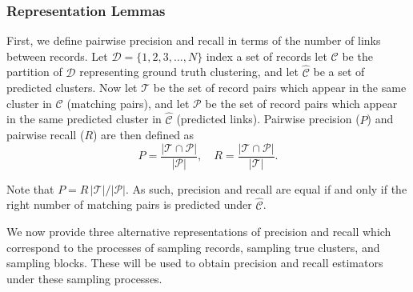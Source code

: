 \documentclass[fontsize=11pt]{article}
\theoremstyle{definition}
\begin{document}

\subsubsection{Representation Lemmas}

First, we define pairwise precision and recall in terms of the number of links between records. Let $\mathcal{D} = \{1, 2, 3, \dots, N\}$ index a set of records let $\mathcal{C}$ be the partition of $\mathcal{D}$ representing ground truth clustering, and let $\widehat{\mathcal{C}}$ be a set of predicted clusters. Now let $\mathcal{T}$ be the set of record pairs which appear in the same cluster in $\mathcal{C}$ (matching pairs), and let $\mathcal{P}$ be the set of record pairs which appear in the same predicted cluster in $\widehat{\mathcal{C}}$ (predicted links). Pairwise precision ($P$) and pairwise recall ($R$) are then defined as
\begin{equation}\label{eq:def_P_R}
    P = \frac{\lvert \mathcal{T} \cap \mathcal{P} \rvert}{\lvert \mathcal{P} \rvert}, \quad R = \frac{\lvert \mathcal{T} \cap \mathcal{P} \rvert}{\lvert \mathcal{T} \rvert}.
\end{equation}

Note that $P = R \, \lvert \mathcal{T} \rvert / \lvert \mathcal{P} \rvert$. As such, precision and recall are equal if and only if the right number of matching pairs is predicted under $\widehat{\mathcal{C}}$.

We now provide three alternative representations of precision and recall which correspond to the processes of sampling records, sampling true clusters, and sampling blocks. These will be used to obtain precision and recall estimators under these sampling processes.
\end{document}
